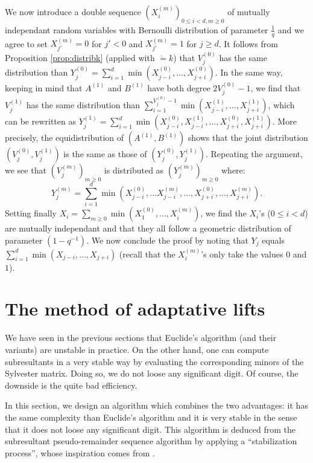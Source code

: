 \documentclass{article}
\begin{document}
We now introduce a double sequence $(X_i^{(m)})_{0 \leq i < d, m 
\geq 0}$ of mutually independant random variables with Bernoulli
distribution of parameter $\frac 1 q$ and we agree to set 
$X_{j'}^{(m)} = 0$ for $j' < 0$ and $X_{j'}^{(m)} = 1$ for $j \geq d$.
It follows from Proposition \ref{prop:distribk} (applied with $\ring = 
k$) that $V_j^{(0)}$ has the same distribution than 
$Y_j^{(0)} = \sum_{i=1}^d \min(X_{j-i}^{(0)}, \ldots, X_{j+i}^{(0)})$.
In the same way, keeping in mind that $A^{(1)}$ and $B^{(1)}$ have both 
degree $2V_j^{(0)} - 1$, we find that $V_j^{(1)}$ has the same 
distribution than $\sum_{i=1}^{V_j^{(0)} - 1} \min(X_{j-i}^{(1)}, 
\ldots, X_{j+i}^{(1)})$, which can be rewritten as
$Y_j^{(1)} = \sum_{i=1}^d \min(X_{j-i}^{(0)}, X_{j-i}^{(1)}, \ldots, 
X_{j+i}^{(0)}, X_{j+i}^{(1)})$. More precisely,
the equidistribution of $(A^{(1)}, B^{(1)})$ shows that the 
joint distribution $(V_j^{(0)}, V_j^{(1)})$ is the same as those
of $(Y_j^{(0)}, Y_j^{(1)})$. Repeating the argument, we see that
$(V_j^{(m)})_{m \geq 0}$ is distributed as $(Y_j^{(m)})_{m \geq 0}$
where:
$$Y_j^{(m)} = \sum_{i=1}^d \min(X_{j-i}^{(0)}, \ldots X_{j-i}^{(m)}, 
\ldots, X_{j+i}^{(0)}, \ldots, X_{j+i}^{(m)}).$$
Setting finally $X_i = \sum_{m \geq 0} \min(X_1^{(0)}, \ldots, 
X_i^{(m)})$, we find the $X_i$'s ($0 \leq i < d$) are mutually 
independant and that they all follow a geometric distribution of 
parameter $(1 - q^{-1})$. We now conclude the proof by noting that 
$Y_j$ equals $\sum_{i=1}^d \min(X_{j-i}, \ldots, X_{j+i})$ (recall
that the $X_i^{(m)}$'s only take the values $0$ and $1$).

\section{The method of adaptative lifts}
\label{sec:stable}

We have seen in the previous sections that Euclide's algorithm (and 
their variants) are unstable in practice. On the other hand, 
one can compute subresultants in a very stable way by evaluating
the corresponding minors of the Sylvester matrix. Doing so, we do
not loose any significant digit. Of course, the downside is the
quite bad efficiency.

In this section, we design an algorithm which combines the two
advantages: it has the same complexity than Euclide's algorithm
and it is very stable in the sense that it does not loose any
significant digit. 
This algorithm is deduced from the subresultant pseudo-remainder
sequence algorithm by applying a ``stabilization process'', whose 
inspiration comes from \cite{padicprec}.
\end{document}
